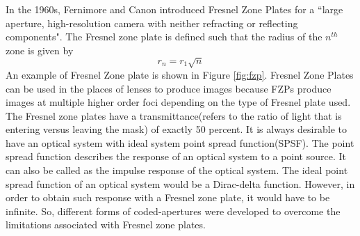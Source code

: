 In the 1960s, Fernimore and Canon introduced Fresnel Zone Plates for a ``large aperture, high-resolution camera with neither refracting or reflecting components"\cite{Cannon1}. The Fresnel zone plate is defined such that the radius of the $n^{th}$ zone is given by 
\begin{equation}
r_n  = r_1 \sqrt{n}
\end{equation}
An example of Fresnel Zone plate is shown in Figure \ref{fig:fzp}. Fresnel Zone Plates can be used in the places of lenses to produce images because FZPs produce images at multiple higher order foci depending on the type of Fresnel plate used. The Fresnel zone plates have a transmittance(refers to the ratio of light that is entering versus leaving the mask) of exactly 50 percent. It is always desirable to have an optical system with ideal system point spread function(SPSF). The point spread function describes the response of an optical system to a point source. It can also be called as the impulse response of the optical system. The ideal point spread function of an optical system would be a Dirac-delta function. However, in order to obtain such response with a Fresnel zone plate, it would have to be infinite. So, different forms of coded-apertures were developed to overcome the limitations associated with Fresnel zone plates. 

